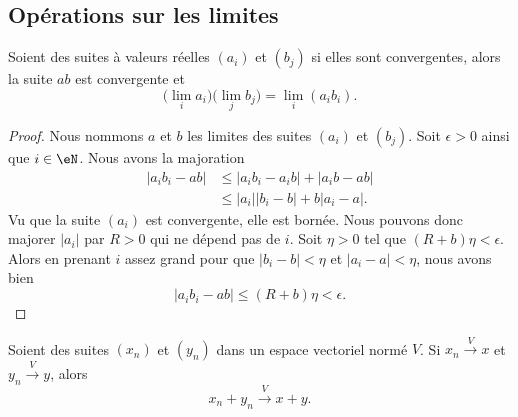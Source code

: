 \subsection{Opérations sur les limites}

\begin{proposition}     \label{PROPooIQOAooJPMoDD}
    Soient des suites à valeurs réelles \( (a_i)\) et \( (b_j)\) si elles sont convergentes, alors la suite \( ab\) est convergente et
    \begin{equation}
        \big( \lim_ia_i \big)\big( \lim_jb_j \big)=\lim_i(a_ib_i).
    \end{equation}
\end{proposition}

\begin{proof}
    Nous nommons \( a\) et \( b\) les limites des suites \( (a_i)\) et \( (b_j)\). Soit \( \epsilon>0\) ainsi que \( i\in \eN\). Nous avons la majoration
    \begin{subequations}
        \begin{align}
            | a_ib_i-ab |&\leq | a_ib_i-a_ib |+| a_ib-ab |\\
            &\leq | a_i | |b_i-b |+b| a_i-a |.
        \end{align}
    \end{subequations}
    Vu que la suite \( (a_i)\) est convergente, elle est bornée. Nous pouvons donc majorer \( | a_i |\) par \( R>0\) qui ne dépend pas de \( i\). Soit \( \eta>0\) tel que \( (R+b)\eta<\epsilon\). Alors en prenant \( i\) assez grand pour que \( | b_i-b |<\eta\) et \( | a_i-a |<\eta\), nous avons bien
    \begin{equation}
        | a_ib_i-ab |\leq (R+b)\eta<\epsilon.
    \end{equation}
\end{proof}

\begin{proposition}     \label{PROPooICZMooGfLdPc}
    Soient des suites \( (x_n)\) et \( (y_n)\) dans un espace vectoriel normé \( V\). Si \( x_n\stackrel{V}{\longrightarrow}x\) et \( y_n\stackrel{V}{\longrightarrow}y\), alors
    \begin{equation}
        x_n+y_n\stackrel{V}{\longrightarrow}x+y.
    \end{equation}
\end{proposition}

